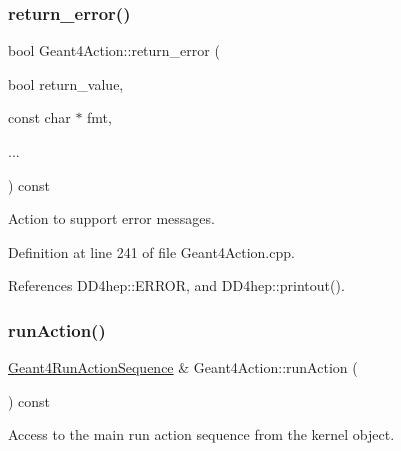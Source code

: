 \hypertarget{class_d_d4hep_1_1_simulation_1_1_geant4_action_a2f0ed49ced8246f3165476ed5866620a}{}\label{class_d_d4hep_1_1_simulation_1_1_geant4_action_a2f0ed49ced8246f3165476ed5866620a} 
\subsubsection{\texorpdfstring{return\+\_\+error()}{return\_error()}}
{\footnotesize\ttfamily bool Geant4\+Action\+::return\+\_\+error (\begin{DoxyParamCaption}\item[{bool}]{return\+\_\+value,  }\item[{const char $\ast$}]{fmt,  }\item[{}]{... }\end{DoxyParamCaption}) const}



Action to support error messages. 



Definition at line 241 of file Geant4\+Action.\+cpp.



References D\+D4hep\+::\+E\+R\+R\+OR, and D\+D4hep\+::printout().

\hypertarget{class_d_d4hep_1_1_simulation_1_1_geant4_action_a3d2a1a32cd7f6733c3553ce7723e6fb7}{}\label{class_d_d4hep_1_1_simulation_1_1_geant4_action_a3d2a1a32cd7f6733c3553ce7723e6fb7} 
\subsubsection{\texorpdfstring{run\+Action()}{runAction()}}
{\footnotesize\ttfamily \hyperlink{class_d_d4hep_1_1_simulation_1_1_geant4_run_action_sequence}{Geant4\+Run\+Action\+Sequence} \& Geant4\+Action\+::run\+Action (\begin{DoxyParamCaption}{ }\end{DoxyParamCaption}) const}



Access to the main run action sequence from the kernel object. 



